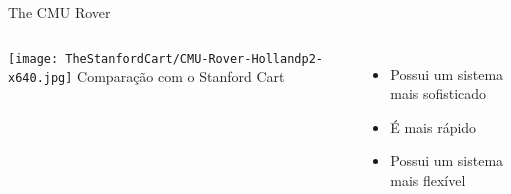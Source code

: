 \begin{frame}[t]{The CMU Rover}
    \begin{columns}
            \texttt{[image: TheStanfordCart/CMU-Rover-Hollandp2-x640.jpg]}
           Comparação com o Stanford Cart
            \begin{itemize} 
                \item Possui um sistema mais sofisticado
                \item É mais rápido
                \item Possui um sistema mais flexível
            \end{itemize}
            \end{columns}
\end{frame}

